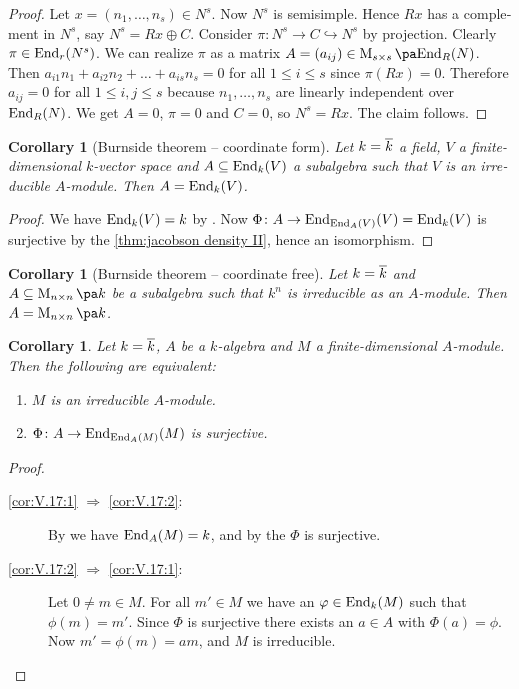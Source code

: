 \documentclass[12pt,a4paper]{scrartcl}
\theoremstyle{cplain}
\newtheorem{cor}[thmcounter]{Corollary}
\theoremstyle{cplain}
\theoremstyle{cplain}
\theoremstyle{definition}
\begin{document}
\begin{otherlanguage}{english}
\begin{proof}
  Let $x=(n_1,\ldots,n_s) \in N^s$. Now $N^s$ is semisimple. Hence $Rx$ has a complement in $N^s$, say $N^s = Rx \oplus C$. Consider $\pi\colon N^s \to C \hookrightarrow N^s$ by projection. Clearly $\pi \in \operatorname{End}_r(N^s)$. We can realize $\pi$ as a matrix $A=(a_{ij})\in \Mat s {\End_R(N)}$. Then $a_{i1}n_1 + a_{i2}n_2 + \ldots + a_{is}n_s = 0$ for all $1\le i\le s$ since $\pi(Rx) = 0$. Therefore $a_{ij} = 0$ for all $1\le i,j\le s$ because $n_1,\ldots,n_s$ are linearly independent over $\operatorname{End}_R(N)$. We get $A=0$, $\pi=0$ and $C=0$, so $N^s=Rx$. The claim follows.
\end{proof}

\begin{cor}[Burnside theorem -- coordinate form] %
  Let $k=\overline k$ a field, $V$ a finite-dimensional $k$-vector space and $A\subseteq \operatorname{End}_k(V)$ a subalgebra such that $V$ is an irreducible $A$-module. Then $A = \operatorname{End}_k(V)$.
\end{cor}
\begin{proof}
  We have $\operatorname{End}_k(V) = k$ by . Now $\Phi\colon A \to \operatorname{End}_{\operatorname{End}_{A}(V)}(V) = \operatorname{End}_k(V)$ is surjective by the \cref{thm:jacobson density II}, hence an isomorphism.
\end{proof}

\begin{cor}[Burnside theorem -- coordinate free] %
  Let $k=\overline k$ and $A \subseteq \Mat nk$ be a subalgebra such that $k^n$ is irreducible as an $A$-module. Then $A = \Mat nk$.
\end{cor}

\begin{cor} \label{cor:V.17} %
  Let $k=\overline k$, $A$ be a $k$-algebra and $M$ a finite-dimensional $A$-module. Then the following are equivalent:
  \begin{enumerate}
    \item $M$ is an irreducible $A$-module. \label{cor:V.17:1}
    \item $\Phi\colon A \to \operatorname{End}_{\operatorname{End}_{A}(M)}(M)$ is surjective. \label{cor:V.17:2}
  \end{enumerate}
\end{cor}
\begin{proof}
  \leavevmode
  \begin{description}
    \item[\ref{cor:V.17:1} $\Rightarrow$ \ref{cor:V.17:2}:] By  we have $\operatorname{End}_A(M) = k$, and by the  $\Phi$ is surjective.
    \item[\ref{cor:V.17:2} $\Rightarrow$ \ref{cor:V.17:1}:] Let $0\neq m\in M$. For all $m' \in M$ we have an $\varphi \in \operatorname{End}_k(M)$ such that $\phi(m) = m'$. Since $\Phi$ is surjective there exists an $a\in A$ with $\Phi(a) = \phi$. Now $m' = \phi(m) = am$, and $M$ is irreducible.
    \qedhere
  \end{description}
\end{proof}


\end{otherlanguage}
\end{document}
